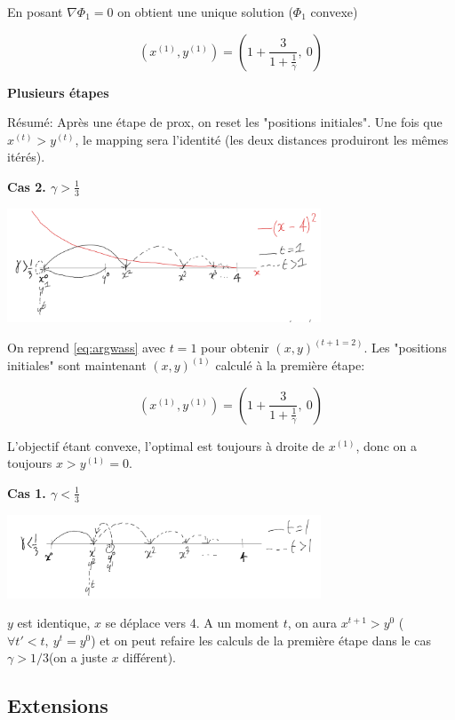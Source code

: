 En posant $\nabla \varPhi_1 = 0$ on obtient une unique solution ($\varPhi_1$ convexe)

\begin{equation}
	(x^{(1)}, y^{(1)}) = (1 + \frac{3}{1+\frac{1}{\gamma}}, \ 0)
\end{equation}

\textbf{Plusieurs étapes}

Résumé: Après une étape de prox, on reset les "positions initiales". Une fois que $x^{(t)}>y^{(t)}$, le mapping sera l'identité (les deux distances produiront les mêmes itérés).



\textbf{Cas 2. $\gamma > \frac{1}{3}$}

\includegraphics[width=0.7\textwidth]{imgs/schema_big_gamma.png}

On reprend \cref{eq:argwass} avec $t=1$ pour obtenir $(x,y)^{(t+1=2)}$. Les "positions initiales" sont maintenant $(x,y)^{(1)}$ calculé à la première étape:

\begin{equation}
	(x^{(1)}, y^{(1)}) = (1 + \frac{3}{1+\frac{1}{\gamma}}, \ 0)
\end{equation}

L'objectif étant convexe, l'optimal est toujours à droite de $x^{(1)}$, donc on a toujours $x > y^{(1)} = 0$.

\textbf{Cas 1. $\gamma < \frac{1}{3}$}

\includegraphics[width=0.7\textwidth]{imgs/schema_small_gamma.png}

$y$ est identique, $x$ se déplace vers 4. A un moment $t$, on aura $x^{t+1} > y^{0}$ ($\forall t' < t, \ y^t = y^0$) et on peut refaire les calculs de la première étape dans le cas $\gamma > 1/3$(on a juste $x$ différent).

\subsection{Extensions}


